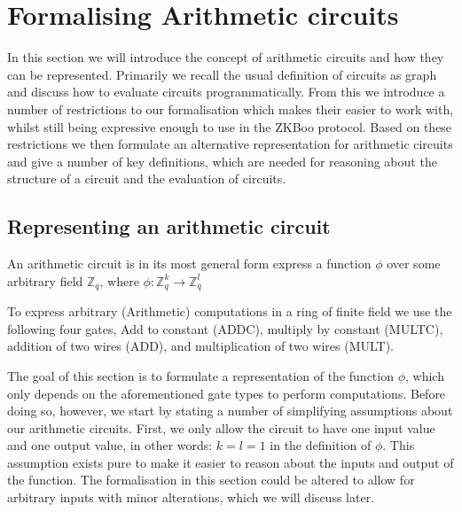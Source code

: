 \section{Formalising Arithmetic circuits}
\label{sec:arith_circuits}
In this section we will introduce the concept of arithmetic circuits and how they
can be represented. Primarily we recall the usual definition of circuits as
graph and discuss how to evaluate circuits programmatically. From this we
introduce a number of restrictions to our formalisation which makes their easier
to work with, whilst still being expressive enough to use in the ZKBoo protocol.
Based on these restrictions we then formulate an alternative representation for
arithmetic circuits and give a number of key definitions, which are needed for
reasoning about the structure of a circuit and the evaluation of circuits.

\subsection{Representing an arithmetic circuit}
\label{subsec:arith-representation}
An arithmetic circuit is in its most general form express a function $\phi$ over some
arbitrary field $\mathbb{Z}_{q}$, where $\phi : \mathbb{Z}_{q}^{k} \rightarrow \mathbb{Z}_{q}^{l}$

To express arbitrary (Arithmetic) computations in a ring of finite field we
use the following four gates, Add to constant (ADDC), multiply by constant
(MULTC), addition of two wires (ADD), and multiplication of two wires (MULT).

The goal of this section is to formulate a representation of the function
$\phi$, which only depends on the aforementioned gate types to perform
computations. Before doing so, however, we start by stating a number of
simplifying assumptions about our arithmetic circuits. First, we only allow the
circuit to have one input value and one output value, in other words:
$k = l = 1$ in the definition of $\phi$.
This assumption exists pure to make it easier to reason about the inputs and
output of the function. The formalisation in this section could be altered to
allow for arbitrary inputs with minor alterations, which we will discuss later.

